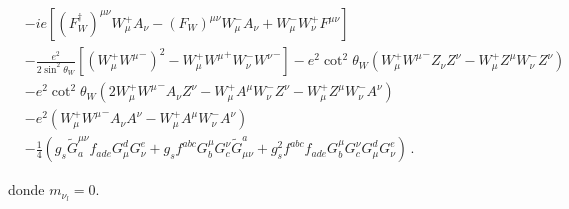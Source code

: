 \begin{frame}
\begin{align}
&-ie\left[(F_W^\dagger)^{\mu\nu}W_\mu^+ A_\nu-(F_W)^{\mu\nu}W_\mu^- A_\nu+W_\mu^-W_\nu^+F^{\mu\nu}\right]\nonumber\\
&-\frac{e^2}{2\sin^2\theta_W}\left[\left(W_\mu^+{W^\mu}^-\right)^2-W_\mu^+{W^\mu}^+W_\nu^-{W^\nu}^-\right]
-e^2\cot^2\theta_W\left(W_\mu^+{W^\mu}^-Z_\nu Z^\nu-W_\mu^+Z^\mu W_\nu^-Z^\nu\right)\nonumber\\
&-e^2\cot^2\theta_W\left(2W_\mu^+{W^\mu}^-A_\nu Z^\nu-W_\mu^+A^\mu W_\nu^-Z^\nu-W_\mu^+Z^\mu W_\nu^-A^\nu\right)\nonumber\\
&-e^2\left(W_\mu^+{W^\mu}^-A_\nu A^\nu-W_\mu^+A^\mu W_\nu^-A^\nu\right)\nonumber\\
&- \frac{1}{4}\left(g_s\widetilde{G}^{\mu\nu}_af_{a d e}G^d_\mu G^e_\nu
    +g_sf^{a b c}G_b^\mu G_c^\nu\widetilde{G}_{\mu\nu}^a
    +g_s^2f^{a b c}f_{a d e}G_b^\mu G_c^\nu G^d_\mu G^e_\nu\right)\,.
\end{align}


donde $m_{\nu_l}=0$.

\end{frame}

